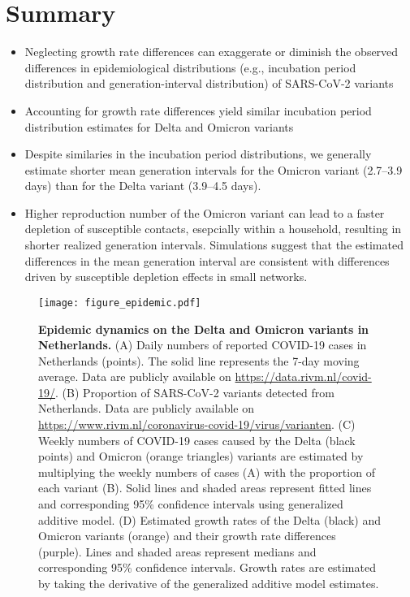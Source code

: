 \documentclass[12pt]{article}
\date{\today}
\begin{document}
\begin{flushleft}{
	\Large
	\textbf{}
}
\bigskip

\section*{Summary}

\begin{itemize}
  \item Neglecting growth rate differences can exaggerate or diminish the observed differences in epidemiological distributions (e.g., incubation period distribution and generation-interval distribution) of SARS-CoV-2 variants
  \item Accounting for growth rate differences yield similar incubation period distribution estimates for Delta and Omicron variants
  \item Despite similaries in the incubation period distributions, we generally estimate shorter mean generation intervals for the Omicron variant (2.7--3.9 days) than for the Delta variant (3.9--4.5 days).
  \item Higher reproduction number of the Omicron variant can lead to a faster depletion of susceptible contacts, esepcially within a household, resulting in shorter realized generation intervals. Simulations suggest that the estimated differences in the mean generation interval are consistent with differences driven by susceptible depletion effects in small networks.
\end{itemize}

\end{flushleft}

\pagebreak

\begin{figure}[!th]
\texttt{[image: figure\_epidemic.pdf]}
\caption{
\textbf{Epidemic dynamics on the Delta and Omicron variants in Netherlands.}
(A) Daily numbers of reported COVID-19 cases in Netherlands (points).
The solid line represents the 7-day moving average.
Data are publicly available on \url{https://data.rivm.nl/covid-19/}.
(B) Proportion of SARS-CoV-2 variants detected from Netherlands. Data are publicly available on \url{https://www.rivm.nl/coronavirus-covid-19/virus/varianten}.
(C) Weekly numbers of COVID-19 cases caused by the Delta (black points) and Omicron (orange triangles) variants are estimated by multiplying the weekly numbers of cases (A) with the proportion of each variant (B).
Solid lines and shaded areas represent fitted lines and corresponding 95\% confidence intervals using generalized additive model.
(D) Estimated growth rates of the Delta (black) and Omicron variants (orange) and their growth rate differences (purple).
Lines and shaded areas represent medians and corresponding 95\% confidence intervals.
Growth rates are estimated by taking the derivative of the generalized additive model estimates.
}
\end{figure}
\end{document}
